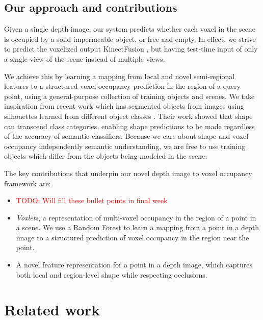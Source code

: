\documentclass[10pt,twocolumn,letterpaper]{article}
\newcommand{\todo}[1]{\textcolor{red}{TODO: #1}}
\begin{document}
\subsection{Our approach and contributions}

Given a single depth image, our system predicts whether each voxel in the scene is occupied by a solid impermeable object, or free and empty.
In effect, we strive to predict the voxelized output KinectFusion \cite{izadi-uist-2011}, but having test-time input of only a single view of the scene instead of multiple views.

We achieve this by learning a mapping from local and novel semi-regional features to a structured voxel occupancy prediction in the region of a query point, using a general-purpose collection of training objects and scenes.
We take inspiration from recent work which has segmented objects from images using silhouettes learned from different object classes \cite{kim-eccv-2012}.
Their work showed that shape can transcend class categories, enabling shape predictions to be made regardless of the accuracy of semantic classifiers.
Because we care about shape and voxel occupancy independently semantic understanding, we are free to use training objects which differ from the objects being modeled in the scene.

The key contributions that underpin our novel depth image to voxel occupancy framework are:
\begin{itemize}
\item \todo{Will fill these bullet points in final week}
\item \emph{Voxlets}, a representation of multi-voxel occupancy in the region of a point in a scene. 
We use a Random Forest to learn a mapping from a point in a depth image to a structured prediction of voxel occupancy in the region near the point.
\item A novel feature representation for a point in a depth image, which captures both local and region-level shape while respecting occlusions.
\end{itemize}


\section{Related work}
\end{document}
